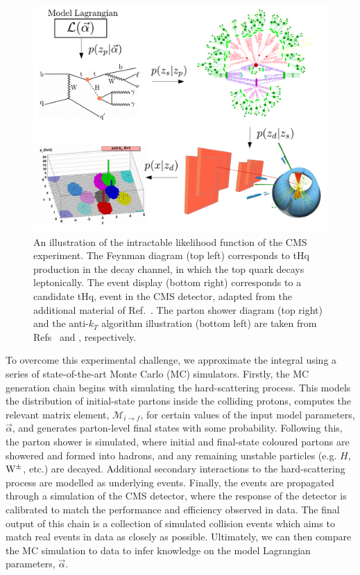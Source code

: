 \begin{figure}[t]
  \centering
  \includegraphics[width=1\textwidth]{Figures/cms/mc_integral.pdf}
  \caption[The intractable likelihood function of the CMS experiment]
  {
    An illustration of the intractable likelihood function of the CMS experiment. The Feynman diagram (top left) corresponds to tHq production in the \Hgg decay channel, in which the top quark decays leptonically. The event display (bottom right) corresponds to a candidate tHq, \Hgg event in the CMS detector, adapted from the additional material of Ref.~\cite{CMS-PAS-HIG-19-015}. The parton shower diagram (top right) and the anti-$k_T$ algorithm illustration (bottom left) are taken from Refs~\cite{Hoche:2014rga} and \cite{Cacciari:2008gp}, respectively.
  }
  \label{fig:mc_illustration}
\end{figure}

To overcome this experimental challenge, we approximate the integral using a series of state-of-the-art Monte Carlo (MC) simulators. Firstly, the MC generation chain begins with simulating the hard-scattering process. This models the distribution of initial-state partons inside the colliding protons, computes the relevant matrix element, $\mathcal{M}_{i\rightarrow f}$, for certain values of the input model parameters, $\vec{\alpha}$, and generates parton-level final states with some probability. Following this, the parton shower is simulated, where initial and final-state coloured partons are showered and formed into hadrons, and any remaining unstable particles (e.g. $H$, ${\rm{W}}^{\pm}$, etc.) are decayed. Additional secondary interactions to the hard-scattering process are modelled as underlying events. Finally, the events are propagated through a simulation of the CMS detector, where the response of the detector is calibrated to match the performance and efficiency observed in data. The final output of this chain is a collection of simulated collision events which aims to match real events in data as closely as possible. Ultimately, we can then compare the MC simulation to data to infer knowledge on the model Lagrangian parameters, $\vec{\alpha}$.


